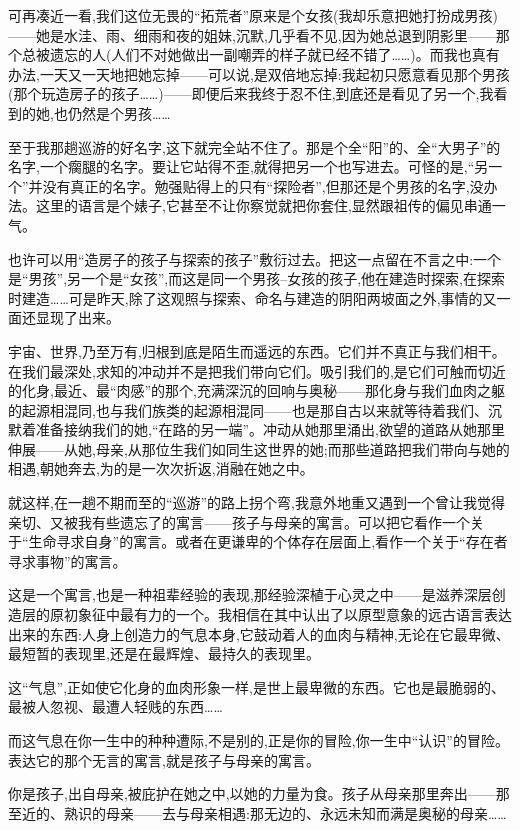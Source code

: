 可再凑近一看,我们这位无畏的“拓荒者”原来是个女孩(我却乐意把她打扮成男孩)——她是水洼、雨、细雨和夜的姐妹,沉默,几乎看不见,因为她总退到阴影里——那个总被遗忘的人(人们不对她做出一副嘲弄的样子就已经不错了……)。而我也真有办法,一天又一天地把她忘掉——可以说,是双倍地忘掉:我起初只愿意看见那个男孩(那个玩造房子的孩子……)——即便后来我终于忍不住,到底还是看见了另一个,我看到的她,也仍然是个男孩……

至于我那趟巡游的好名字,这下就完全站不住了。那是个全“阳”的、全“大男子”的名字,一个瘸腿的名字。要让它站得不歪,就得把另一个也写进去。可怪的是,“另一个”并没有真正的名字。勉强贴得上的只有“探险者”,但那还是个男孩的名字,没办法。这里的语言是个婊子,它甚至不让你察觉就把你套住,显然跟祖传的偏见串通一气。

也许可以用“造房子的孩子与探索的孩子”敷衍过去。把这一点留在不言之中:一个是“男孩”,另一个是“女孩”,而这是同一个男孩–女孩的孩子,他在建造时探索,在探索时建造……可是昨天,除了这观照与探索、命名与建造的阴阳两坡面之外,事情的又一面还显现了出来。

宇宙、世界,乃至万有,归根到底是陌生而遥远的东西。它们并不真正与我们相干。在我们最深处,求知的冲动并不是把我们带向它们。吸引我们的,是它们可触而切近的化身,最近、最“肉感”的那个,充满深沉的回响与奥秘——那化身与我们血肉之躯的起源相混同,也与我们族类的起源相混同——也是那自古以来就等待着我们、沉默着准备接纳我们的她,“在路的另一端”。冲动从她那里涌出,欲望的道路从她那里伸展——从她,母亲,从那位生我们如同生这世界的她;而那些道路把我们带向与她的相遇,朝她奔去,为的是一次次折返,消融在她之中。

 就这样,在一趟不期而至的“巡游”的路上拐个弯,我意外地重又遇到一个曾让我觉得亲切、又被我有些遗忘了的寓言——孩子与母亲的寓言。可以把它看作一个关于“生命寻求自身”的寓言。或者在更谦卑的个体存在层面上,看作一个关于“存在者寻求事物”的寓言。

这是一个寓言,也是一种祖辈经验的表现,那经验深植于心灵之中——是滋养深层创造层的原初象征中最有力的一个。我相信在其中认出了以原型意象的远古语言表达出来的东西:人身上创造力的气息本身,它鼓动着人的血肉与精神,无论在它最卑微、最短暂的表现里,还是在最辉煌、最持久的表现里。

这“气息”,正如使它化身的血肉形象一样,是世上最卑微的东西。它也是最脆弱的、最被人忽视、最遭人轻贱的东西……

而这气息在你一生中的种种遭际,不是别的,正是你的冒险,你一生中“认识”的冒险。表达它的那个无言的寓言,就是孩子与母亲的寓言。

你是孩子,出自母亲,被庇护在她之中,以她的力量为食。孩子从母亲那里奔出——那至近的、熟识的母亲——去与母亲相遇:那无边的、永远未知而满是奥秘的母亲……

